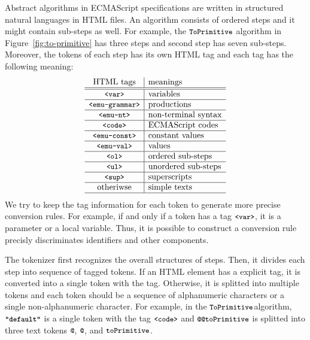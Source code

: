 Abstract algorithms in ECMAScript specifications are written in structured
natural languages in HTML files. An algorithm consists of ordered steps
and it might contain sub-steps as well. For example,
the \( \texttt{\small ToPrimitive} \) algorithm in Figure~\ref{fig:to-primitive}
has three steps and second step has seven sub-steps.
Moreover, the tokens of each step has its own HTML tag and each tag
has the following meaning:
\[
  \begin{array}{c|l}
    \text{HTML tags} & \text{meanings}\\\hline\hline
    \texttt{\small<var>} & \text{variables}\\\hline
    \texttt{\small<emu-grammar>} & \text{productions}\\\hline
    \texttt{\small<emu-nt>} & \text{non-terminal syntax}\\\hline
    \texttt{\small<code>} & \text{ECMAScript codes}\\\hline
    \texttt{\small<emu-const>} & \text{constant values}\\\hline
    \texttt{\small<emu-val>} & \text{values}\\\hline
    \texttt{\small<ol>} & \text{ordered sub-steps}\\\hline
    \texttt{\small<ul>} & \text{unordered sub-steps}\\\hline
    \texttt{\small<sup>} & \text{superscripts}\\\hline
    \text{otheriwse} & \text{simple texts}\\\hline
  \end{array}
\]
We try to keep the tag information for each token to generate more
precise conversion rules. For example, if and only if a token has a tag
\( \texttt{\small<var>} \), it is a parameter or a local variable.
Thus, it is possible to construct a conversion rule precisly discriminates
identifiers and other components.

The tokenizer first recognizes the overall structures of steps.
Then, it divides each step into sequence of tagged tokens.
If an HTML element has a explicit tag, it is converted into a single token
with the tag. Otherwise, it is splitted into multiple tokens and each token
should be a sequence of alphanumeric characters or a single
non-alphanumeric character. For example, in the \( \texttt{\small ToPrimitive} \)algorithm,
\( \textbf{\texttt{\small"default"}} \) is a single token with the tag \( \texttt{\small<code>} \)
and \( \code{@@toPrimitive} \) is splitted into three text tokens
\( \code{@} \), \( \code{@} \), and \( \texttt{\small toPrimitive} \).

